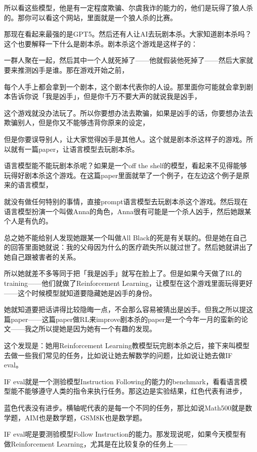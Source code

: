 \documentclass[12pt,a4paper]{article}
\begin{document}
所以看这些模型，他是有一定程度欺骗、尔虞我诈的能力的，他们是玩得了狼人杀的。那你可以看这个网站，里面就是一个狼人杀的比赛。

那现在看起来最强的是GPT5。然后还有人让AI去玩剧本杀。大家知道剧本杀吗？这个也要解释一下什么是剧本杀。剧本杀这个游戏是这样子的：

一群人聚在一起，然后其中一个人就死掉了——他就假装他死掉了——然后大家就要来推测凶手是谁。那在游戏开始之前，

每个人手上都会拿到一个剧本，这个剧本代表你的人设。那里面你可能就会拿到剧本告诉你说「我是凶手」，但是你千万不要大声的就说我是凶手，

这个游戏就没办法玩了。所以你要想办法去欺骗，如果是凶手的话，你要想办法去欺骗别人，但是你又不能够违背你原来的设定，

但是你要误导别人，让大家觉得凶手是其他人。这个就是剧本杀这样子的游戏。所以就有一篇paper，让语言模型去玩剧本杀。

语言模型能不能玩剧本杀呢？如果是一个off the shelf的模型，看起来不见得能够玩得好剧本杀这个游戏。在这篇paper里面就举了一个例子，在左边这个例子是原来的语言模型，

就没有做任何特别的事情，直接prompt语言模型去玩剧本杀这个游戏。然后现在语言模型扮演一个叫做Anna的角色，Anna很有可能是一个杀人凶手，然后她跟某个人是有仇的。

总之她不能给别人发现她跟某一个叫做All Black的死是有关联的。但是她在自己的回答里面她就说：我的父母因为什么的医疗疏失所以就过世了。然后她就讲出了她自己跟被害者的关系。

所以她就差不多等同于把「我是凶手」就写在脸上了。但是如果今天做了RL的training——他们就做了Reinforcement Learning，让模型在这个游戏里面玩得更好——这个时候模型就知道要隐藏她是凶手的身份。

她就知道要把话讲得比较隐晦一点，不会那么容易被猜出是凶手。但我之所以提这篇paper——这篇paper做RL来improve剧本杀的paper是一个今年一月的蛮新的论文——我之所以提她是因为她有一个有趣的发现。

这个发现是：她用Reinforcement Learning教模型玩完剧本杀之后，接下来叫模型去做一些我们常见的任务，比如说让她去解数学的问题，比如说让她去做IF eval。

IF eval就是一个测验模型Instruction Following的能力的benchmark，看看语言模型能不能够遵守人类的指令来执行任务。那这边是实验结果，红色代表有进步，

蓝色代表没有进步。横轴呢代表的是每一个不同的任务，那比如说Math500就是数学题，AIM也是数学题，GSM8K也是数学题。

IF eval呢是要测验模型Follow Instruction的能力。那发现说呢，如果今天模型有做Reinforcement Learning，尤其是在比较复杂的任务上——
\end{document}
